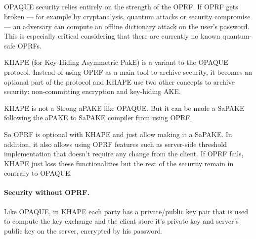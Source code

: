 \documentclass[../report.tex]{subfiles}
\begin{document}



\subsection{}
\paragraph{}

OPAQUE security relies entirely on the strength of the OPRF. If OPRF gets broken --- for example by cryptanalysis, quantum attacks or security compromise --- an adversary can compute an offline dictionary attack on the user's password. This is especially critical considering that there are currently no known quantum-safe OPRFs.

KHAPE (for Key-Hiding Asymmetric PakE) \cite{KHAPE_Paper} is a variant to the OPAQUE protocol. Instead of using OPRF as a main tool to archive security, it becomes an optional part of the protocol and KHAPE use two other concepts to archive security: non-committing encryption and key-hiding AKE.


KHAPE is not a Strong aPAKE like OPAQUE. But it can be made a SaPAKE following the aPAKE to SaPAKE compiler from \cite{OPAQUE_Paper} using OPRF.

So OPRF is optional with KHAPE and just allow making it a SaPAKE. In addition, it also allows using OPRF features such as server-side threshold implementation that doesn't require any change from the client. If OPRF fails, KHAPE just loss these functionalities but the rest of the security remain in contrary to OPAQUE.






\paragraph{Security without OPRF.}
Like OPAQUE, in KHAPE each party has a private/public key pair that is used to compute the key exchange and the client store it's private key and server's public key on the server, encrypted by his password.
\end{document}
